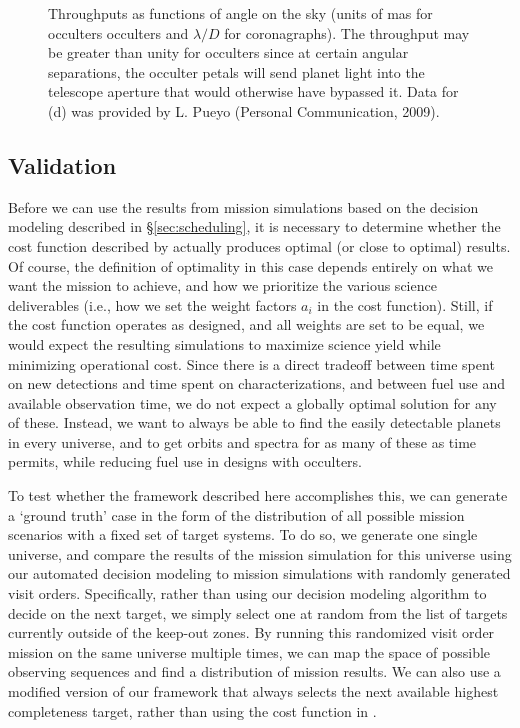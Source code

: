 \begin{figure}[ht!]
 \caption[Throughput Curves]{\label{fig:throughputs} Throughputs as functions of angle on the sky (units of mas for occulters occulters and $\lambda/D$ for coronagraphs). The throughput may be greater than unity for occulters since at certain angular separations, the occulter petals will send planet light into the telescope aperture that would otherwise have bypassed it. Data for (d) was provided by L. Pueyo (Personal Communication, 2009).}
\end{figure}

\subsection{Validation}\label{sec:validation}
Before we can use the results from mission simulations based on the decision modeling described in \S\ref{sec:scheduling}, it is necessary to determine whether the cost function described by   actually produces optimal (or close to optimal) results.  Of course, the definition of optimality in this case depends entirely on what we want the mission to achieve, and how we prioritize the various science deliverables (i.e., how we set the weight factors $a_i$ in the cost function).  Still, if the cost function operates as designed, and all weights are set to be equal, we would expect the resulting simulations to maximize science yield while minimizing operational cost.  Since there is a direct tradeoff between time spent on new detections and time spent on characterizations, and between fuel use and available observation time, we do not expect a globally optimal solution for any of these.  Instead, we want to always be able to find the easily detectable planets in every universe, and to get orbits and spectra for as many of these as time permits, while reducing fuel use in designs with occulters.  

To test whether the framework described here accomplishes this, we can generate a `ground truth' case in the form of the distribution of all possible mission scenarios with a fixed set of target systems.  To do so, we generate one single universe, and compare the results of the mission simulation for this universe using our automated decision modeling to mission simulations with randomly generated visit orders.  Specifically, rather than using our decision modeling algorithm to decide on the next target, we simply select one at random from the list of targets currently outside of the keep-out zones.  By running this randomized visit order mission on the same universe multiple times, we can map the space of possible observing sequences and find a distribution of mission results.  We can also use a modified version of our framework that always selects the next available highest completeness target, rather than using the cost function in .

